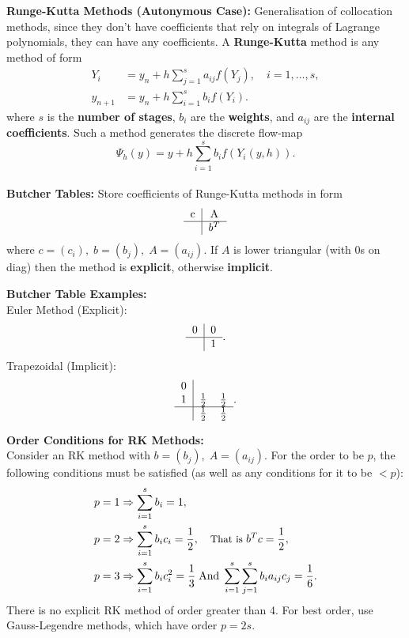 \documentclass[10pt,a4paper]{article}
\renewcommand{\implies}{\Rightarrow}
\begin{document}
\begin{multicols*}{2}
\textbf{Runge-Kutta Methods (Autonymous Case):} Generalisation of collocation methods, since they don't have coefficients that rely on integrals of Lagrange polynomials, they can have any coefficients. A \textbf{Runge-Kutta} method is any method of form 
\begin{align*}
    Y_i &= y_n + h \sum_{j = 1}^s a_{ij}f(Y_j), \quad i = 1,...,s,\\
    y_{n+1} &= y_n + h\sum_{i = 1}^s b_i f(Y_i).
\end{align*}
where $s$ is the \textbf{number of stages}, $b_i$ are the \textbf{weights}, and $a_{ij}$ are the \textbf{internal coefficients}. Such a method generates the discrete flow-map
\[
\Psi_h(y) = y + h \sum_{i = 1}^s b_i f(Y_i(y, h)).
\]\\
\textbf{Butcher Tables:} Store coefficients of Runge-Kutta methods in form 
\[
\begin{tabular}{ c | c }
    c & A \\ 
    \hline
     & $b^T$ \\  
   \end{tabular}
\] where $c = (c_i), \; b = (b_j), \; A = (a_{ij})$. If $A$ is lower triangular (with $0$s on diag) then the method is \textbf{explicit}, otherwise \textbf{implicit}.

\textbf{Butcher Table Examples:} \\
Euler Method (Explicit):
\[
\begin{tabular}{ c | c }
    0 & 0 \\ 
    \hline
     & 1 \\  
   \end{tabular}.
\] Trapezoidal (Implicit):
\[
\begin{tabular}{ c | c c }
    0 & \\ 
    1 & $\frac{1}{2}$ & $\frac{1}{2}$ \\
    \hline
     & $\frac{1}{2}$ & $\frac{1}{2}$ \\  
   \end{tabular}.
\]

\textbf{Order Conditions for RK Methods:}\\
Consider an RK method with $b = (b_j), \; A = (a_{ij})$. For the order to be $p$, the following conditions must be satisfied (as well as any conditions for it to be $<p$):
\begin{align*}
    p = 1 &\implies \sum_{i=1}^s b_i = 1, \\
    p = 2 &\implies \sum_{i=1}^s b_ic_i = \frac{1}{2}, \quad \small\text{That is } b^Tc = \frac{1}{2}\normalsize,\\
    p = 3 &\implies \sum_{i=1}^s b_ic_i^2 = \frac{1}{3} \;\text{And}\; \sum_{i=1}^s\sum_{j=1}^s b_ia_{ij}c_j = \frac{1}{6}.
\end{align*}
There is no explicit RK method of order greater than 4. For best order, use Gauss-Legendre methods, which have order $p = 2s$.\\


\end{multicols*}
\end{document}
